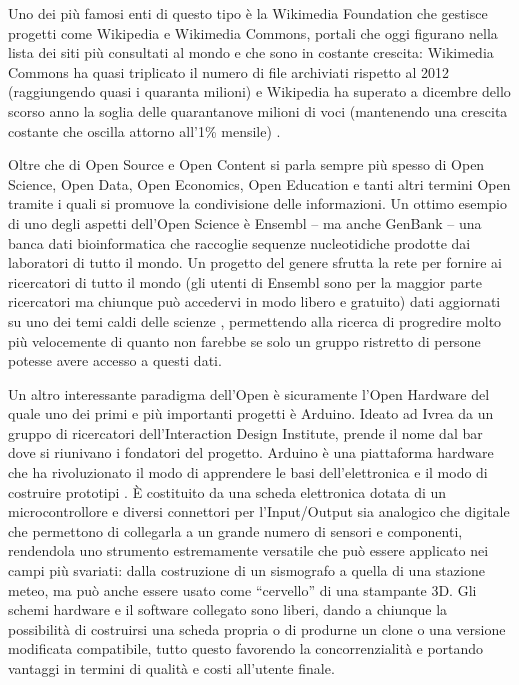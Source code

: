 Uno dei più famosi enti di questo tipo è la Wikimedia Foundation che gestisce progetti come
Wikipedia e Wikimedia Commons, portali che oggi figurano nella lista dei siti più consultati
al mondo e che sono in costante crescita: Wikimedia Commons ha quasi triplicato il numero
di file archiviati rispetto al 2012 (raggiungendo quasi i quaranta milioni) e Wikipedia ha
superato a dicembre dello scorso anno la soglia delle quarantanove milioni di voci
(mantenendo una crescita costante che oscilla attorno all’1\% mensile) \parencite{zachte}.

Oltre che di Open Source e Open Content si parla sempre più spesso di Open Science,
Open Data, Open Economics, Open Education e tanti altri termini Open tramite i quali si
promuove la condivisione delle informazioni. Un ottimo esempio di uno degli aspetti
dell’Open Science è Ensembl – ma anche GenBank – una banca dati bioinformatica che
raccoglie sequenze nucleotidiche prodotte dai laboratori di tutto il mondo. Un progetto del
genere sfrutta la rete per fornire ai ricercatori di tutto il mondo (gli utenti di Ensembl sono
per la maggior parte ricercatori ma chiunque può accedervi in modo libero e gratuito) dati
aggiornati su uno dei temi caldi delle scienze \parencite{ensembl}, permettendo alla ricerca di
progredire molto più velocemente di quanto non farebbe se solo un gruppo ristretto di
persone potesse avere accesso a questi dati.

Un altro interessante paradigma dell’Open è sicuramente l’Open Hardware del quale
uno dei primi e più importanti progetti è Arduino\parencite{arduino}. Ideato ad Ivrea da un
gruppo di ricercatori dell’Interaction Design Institute, prende il nome dal bar dove si
riunivano i fondatori del progetto. Arduino è una piattaforma hardware che ha rivoluzionato
il modo di apprendere le basi dell’elettronica e il modo di costruire prototipi \parencite{lahart}.
È costituito da una scheda elettronica dotata di un microcontrollore e diversi connettori per
l’Input/Output sia analogico che digitale che permettono di collegarla a un grande numero
di sensori e componenti, rendendola uno strumento estremamente versatile che può essere
applicato nei campi più svariati: dalla costruzione di un sismografo a quella di una stazione
meteo, ma può anche essere usato come “cervello” di una stampante 3D. Gli schemi
hardware e il software collegato sono liberi, dando a chiunque la possibilità di costruirsi una
scheda propria o di produrne un clone o una versione modificata compatibile, tutto questo
favorendo la concorrenzialità e portando vantaggi in termini di qualità e costi all’utente finale.